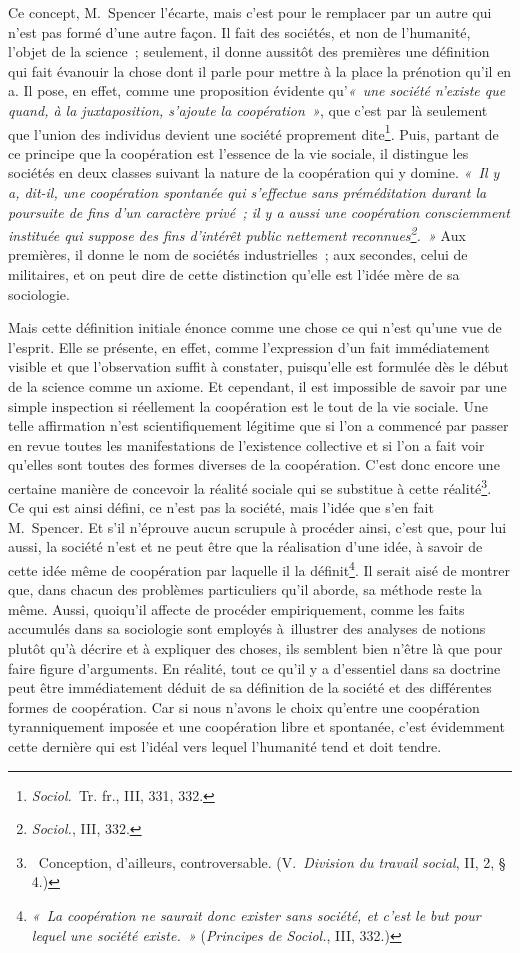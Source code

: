 \documentclass[french,twoside]{book} %
\begin{document}
Ce concept, M. Spencer l’écarte, mais c’est pour le remplacer par un autre qui n’est pas formé d’une autre façon. Il fait des sociétés, et non de l’humanité, l’objet de la science ; seulement, il donne aussitôt des premières une définition qui fait évanouir la chose dont il parle pour mettre à la place la prénotion qu’il en a. Il pose, en effet, comme une proposition évidente qu’\emph{« une société n’existe que quand, à la juxtaposition, s’ajoute la coopération »}, que c’est par là seulement que l’union des individus devient une société proprement dite\footnote{\emph{Sociol.} Tr. fr., III, 331, 332.}. Puis, partant de ce principe que la coopération est l’essence de la vie sociale, il distingue les sociétés en deux classes suivant la nature de la coopération qui y domine. \emph{« Il y a, dit-il, une coopération spontanée qui s’effectue sans préméditation durant la poursuite de fins d’un caractère privé ; il y a aussi une coopération consciemment instituée qui suppose des fins d’intérêt public nettement reconnues\footnote{\emph{Sociol.}, III, 332.}. »} Aux premières, il donne le nom de sociétés industrielles ; aux secondes, celui de militaires, et on peut dire de cette distinction qu’elle est l’idée mère de sa sociologie.\par
Mais cette définition initiale énonce comme une chose ce qui n’est qu’une vue de l’esprit. Elle se présente, en effet, comme l’expression d’un fait immédiatement visible et que l’observation suffit à constater, puisqu’elle est formulée dès le début de la science comme un axiome. Et cependant, il est impossible de savoir par une simple inspection si réellement la coopération est le tout de la vie sociale. Une telle affirmation n’est scientifiquement légitime que si l’on a commencé par passer en revue toutes les manifestations de l’existence collective et si l’on a fait voir qu’elles sont toutes des formes diverses de la coopération. C’est donc encore une certaine manière de concevoir la réalité sociale qui se substitue à cette réalité\footnote{  Conception, d’ailleurs, controversable. (V. \emph{Division du travail social}, II, 2, § 4.)}. Ce qui est ainsi défini, ce n’est pas la société, mais l’idée que s’en fait M. Spencer. Et s’il n’éprouve aucun scrupule à procéder ainsi, c’est que, pour lui aussi, la société n’est et ne peut être que la réalisation d’une idée, à savoir de cette idée même de coopération par laquelle il la définit\footnote{\emph{« La coopération ne saurait donc exister sans société, et c’est le but pour lequel une société existe. »} (\emph{Principes de Sociol.}, III, 332.)}. Il serait aisé de montrer que, dans chacun des problèmes particuliers qu’il aborde, sa méthode reste la même. Aussi, quoiqu’il affecte de procéder empiriquement, comme les faits accumulés dans sa sociologie sont employés à illustrer des analyses de notions plutôt qu’à décrire et à expliquer des choses, ils semblent bien n’être là que pour faire figure d’arguments. En réalité, tout ce qu’il y a d’essentiel dans sa doctrine peut être immédiatement déduit de sa définition de la société et des différentes formes de coopération. Car si nous n’avons le choix qu’entre une coopération tyranniquement imposée et une coopération libre et spontanée, c’est évidemment cette dernière qui est l’idéal vers lequel l’humanité tend et doit tendre.\par
\end{document}
